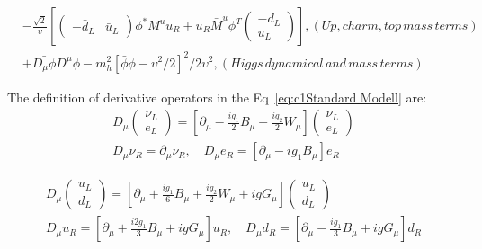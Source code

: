 \begin{equation}
\begin{alignedat}{2}
      & -\frac{\sqrt{2}}{\upsilon}[\begin{pmatrix} -\bar{d}_{L} & \bar{u}_{L} \end{pmatrix}\phi^{*} M^{u}u_{R} + \bar{u}_{R}\bar{M}^{u}\phi^{T}\begin{pmatrix} -d_{L} \\ u_{L} \end{pmatrix}], (Up, charm, top \, mass \, terms) \\
      & +\bar{D_{\mu}\phi}D^{\mu}\phi - m_{h}^{2}[\bar{\phi}\phi-\upsilon^{2}/2]^{2}/2\upsilon^{2}, (Higgs \, dynamical \, and \, mass \, terms)
  \label{eq:c1Standard Modell}
  \end{alignedat}
\end{equation}

The definition of derivative operators in the Eq~\ref{eq:c1Standard Modell} are:
\begin{equation}
  \begin{aligned}
  D_{\mu}\begin{pmatrix} \nu_{L} \\ e_{L} \end{pmatrix} = [\partial_{\mu}-\frac{ig_{1}}{2}B_{\mu}+\frac{ig_{2}}{2}W_{\mu}]\begin{pmatrix} \nu_{L} \\ e_{L} \end{pmatrix} \\
  D_{\mu}\nu_{R} = \partial_{\mu}\nu_{R},\quad D_{\mu}e_{R} = [\partial_{\mu}-ig_{1}B_{\mu}]e_{R}
  \end{aligned}
  \label{eq:c1Standard Modelldl}
\end{equation}

\begin{equation}
  \begin{aligned}
  D_{\mu}\begin{pmatrix} u_{L} \\ d_{L} \end{pmatrix} = [\partial_{\mu}+\frac{ig_{1}}{6}B_{\mu}+\frac{ig_{2}}{2}W_{\mu}+igG_{\mu}]\begin{pmatrix} u_{L} \\ d_{L} \end{pmatrix} \\
  D_{\mu}u_{R} = [\partial_{\mu}+\frac{i2g_{1}}{3}B_{\mu}+igG_{\mu}]u_{R},\quad D_{\mu}d_{R} = [\partial_{\mu}-\frac{ig_{1}}{3}B_{\mu}+igG_{\mu}]d_{R}
  \end{aligned}
  \label{eq:c1Standard Modelldq}
\end{equation}

